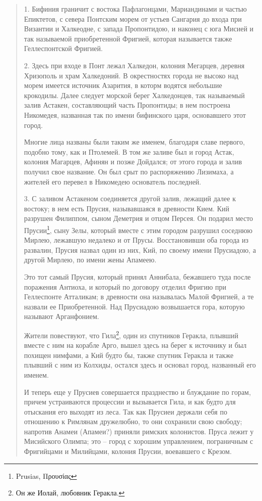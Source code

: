 \begin{quotation}
1. Бифиния граничит с востока Пафлагонцами, Мариандинами и частью Епиктетов, с севера Понтским морем от устьев Сангария до входа при Византии и Халкеодне, с запада Пропонтидою, и наконец с юга Мисией и так называемой приобретенной Фригией, которая называется также Геллеспонтской Фригией.

2. Здесь при входе в Понт лежал Халкедон, колония Мегарцев, деревня Хризополь и храм Халкедоний. В окрестностях города не высоко над морем имеется источник Азарития, в которм водятся небольшие крокодилы. Далее следует морской берег Халкедонцев, так называемый залив Астакен, составляющий часть Пропонтиды; в нем построена Никомедея, названная так по имени бифинского царя, основавшего этот город.

Многие лица названы были таким же именем, благодаря  славе первого, подобно тому, как и Птолемей. В том же заливе был и город Астак, колония Магарцев, Афинян и позже Дойдался; от этого города и залив получил свое название. Он был срыт по распоряжению Лизимаха, а жителей его перевел в Никомедею основатель последней.

3. С заливом Астакеном соединяется другой залив, лежащий далее к востоку; в нем есть Прусия, называвшаяся в древности Кием. Кий разрушен Филиппом, сыном Деметрия и отцом Персея. Он подарил место Прусии\footnote{Prusias, Προυσίας}, сыну Зелы, который вместе с этим городом разрушил соседнюю Мирлею, лежавшую недалеко и от Прусы. Восстановивши оба города из развалин, Прусия назвал один из них, Кий, по своему имени Прусиадою, а другой Мирлею, по имени жены Апамеею. 

Это тот самый Прусия, который принял Аннибала, бежавшего туда после поражения Антиоха, и который по договору отделил Фригию при Геллеспонте Атталикам; в древности она называлась Малой Фригией, а те назвали ее Приобретенной. Над Прусиадою возвышается гора, которую называют Арганфонием. 

Жители повествуют, что Гила\footnote{Он же Иолай, любовник Геракла.}, один из спутников Геракла, плывший вместе с ним на корабле Арго, вышел здесь на берег к источнику и был похищен нимфами, а Кий будто бы, также спутник Геракла и также плывший с ним из Колхиды, остался здесь и основал город, названный его именем. 

И теперь еще у Прусиев совершается празднество и блуждание по горам, причем устраиваются процессии и вызывается Гила, и как будто для отыскания его выходят из леса. Так как Прусиеи держали себя по отношению к Римлянам дружелюбно, то они сохранили свою свободу; напротив Анамеи (Апамеи?) приняли римских колонистов. Пруса лежит у Мисийского Олимпа; это – город с хорошим управлением, пограничным с Фригийцами и Милийцами, колония Прусии, воевавшего с Крезом.
\end{quotation}

